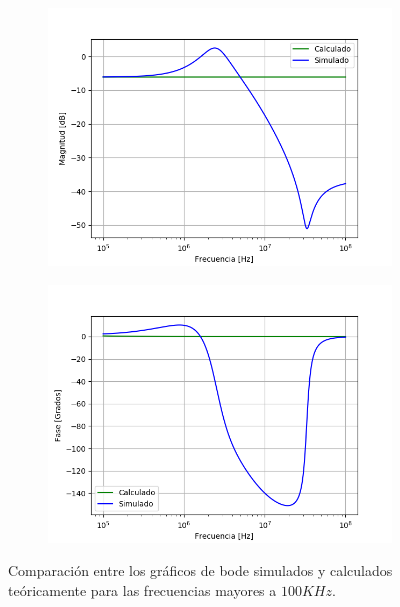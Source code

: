 \begin{figure}[H]
	\centering
	\begin{subfigure}[t]{0.49\textwidth}
	\hspace*{-2cm}
	\centering
		\includegraphics[width=1.2\textwidth]{Imagenes1/bodemag_calc_sim_highf.png}
	\end{subfigure}
	\begin{subfigure}[t]{0.49\textwidth}
	\centering
		\includegraphics[width=1.2\textwidth]{Imagenes1/bodefase_calc_sim_highf.png}
	\end{subfigure}
	\label{fig:bode_calc_sim_highf}
	\caption{Comparación entre los gráficos de bode simulados y calculados teóricamente para las frecuencias mayores a $100KHz$.}
\end{figure}

